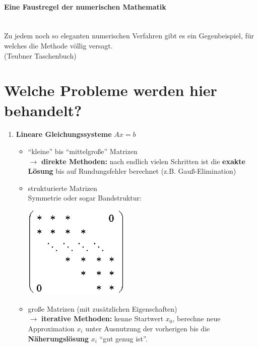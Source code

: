 \paragraph{Eine Faustregel der numerischen Mathematik}~\\
Zu jedem noch so eleganten numerischen Verfahren gibt es ein Gegenbeispiel,
für welches die Methode völlig versagt. \\
{\tiny(Teubner Taschenbuch)}

\section*{Welche Probleme werden hier behandelt?}
\begin{enumerate}
\item \textbf{Lineare Gleichungssysteme} $Ax=b$ 
  \begin{itemize}
  \item \enquote{kleine} bis \enquote{mittelgroße} Matrizen\\
    $\rightarrow$ \textbf{direkte Methoden:} nach endlich vielen
    Schritten ist die \textbf{exakte Lösung} bis auf
    Rundungsfehler berechnet (z.B. Gauß-Elimination)
  \item strukturierte Matrizen \\
    Symmetrie oder sogar Bandstruktur:
    \begin{image}{}
      \includegraphics[width=5cm]{images/band.jpg}  
    \end{image}
    
    
  \item große Matrizen (mit zusätzlichen Eigenschaften)\\
    $\rightarrow$ \textbf{iterative Methoden:} kenne Startwert
    $x_0$, berechne neue Approximation $x_i$ unter
    Ausnutzung der vorherigen bis die
    \textbf{Näherungslösung} $x_i$ \enquote{gut genug ist}.
  \end{itemize}
  

\end{enumerate}
